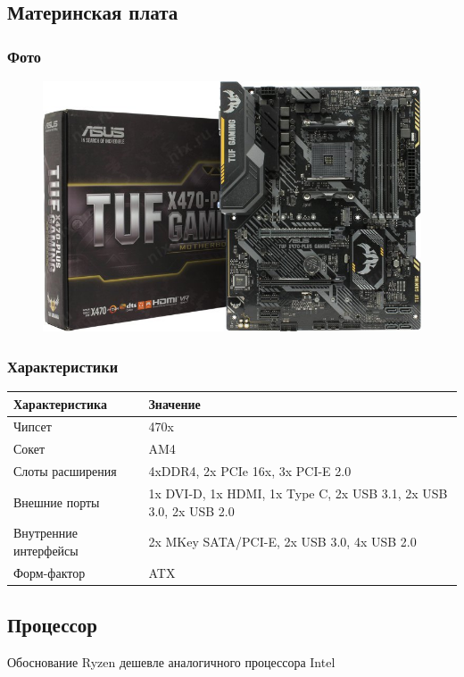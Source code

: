 \documentclass[a4paper]{article}
\begin{document}
\subsection{Материнская плата}
\subsubsection{Фото}
\begin{figure}[H]
\centering
\includegraphics[scale=0.3]{motherboard.jpg} 
\end{figure}
\subsubsection{Характеристики}
\begin{table}[H]
    \centering
    \begin{tabular}{|l|l|}
    \hline
    Характеристика & Значение \\
    \hline
    Чипсет & 470x \\
    Сокет & AM4 \\
    Слоты расширения & 4xDDR4, 2x PCIe 16x, 3x PCI-E 2.0 \\
    Внешние порты & 1x DVI-D, 1x HDMI, 1x Type C, 2x USB 3.1, 2x USB 3.0, 2x USB 2.0\\
    Внутренние интерфейсы & 2x MKey SATA/PCI-E, 2x USB 3.0, 4x USB 2.0 \\
    Форм-фактор & ATX \\
    \hline
\end{tabular}
\end{table}
    
\subsection{Процессор}
Обоснование Ryzen дешевле аналогичного процессора Intel
\end{document}
